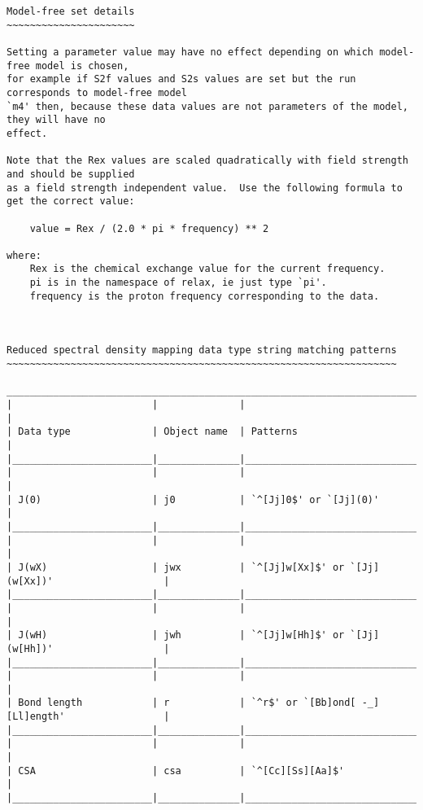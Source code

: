 {\begin{verbatim}
Model-free set details
~~~~~~~~~~~~~~~~~~~~~~

Setting a parameter value may have no effect depending on which model-free model is chosen,
for example if S2f values and S2s values are set but the run corresponds to model-free model
`m4' then, because these data values are not parameters of the model, they will have no
effect.

Note that the Rex values are scaled quadratically with field strength and should be supplied
as a field strength independent value.  Use the following formula to get the correct value:

    value = Rex / (2.0 * pi * frequency) ** 2

where:
    Rex is the chemical exchange value for the current frequency.
    pi is in the namespace of relax, ie just type `pi'.
    frequency is the proton frequency corresponding to the data.



Reduced spectral density mapping data type string matching patterns
~~~~~~~~~~~~~~~~~~~~~~~~~~~~~~~~~~~~~~~~~~~~~~~~~~~~~~~~~~~~~~~~~~~

____________________________________________________________________________________________
|                        |              |                                                  |
| Data type              | Object name  | Patterns                                         |
|________________________|______________|__________________________________________________|
|                        |              |                                                  |
| J(0)                   | j0           | `^[Jj]0$' or `[Jj](0)'                           |
|________________________|______________|__________________________________________________|
|                        |              |                                                  |
| J(wX)                  | jwx          | `^[Jj]w[Xx]$' or `[Jj](w[Xx])'                   |
|________________________|______________|__________________________________________________|
|                        |              |                                                  |
| J(wH)                  | jwh          | `^[Jj]w[Hh]$' or `[Jj](w[Hh])'                   |
|________________________|______________|__________________________________________________|
|                        |              |                                                  |
| Bond length            | r            | `^r$' or `[Bb]ond[ -_][Ll]ength'                 |
|________________________|______________|__________________________________________________|
|                        |              |                                                  |
| CSA                    | csa          | `^[Cc][Ss][Aa]$'                                 |
|________________________|______________|__________________________________________________|




\end{verbatim}}
